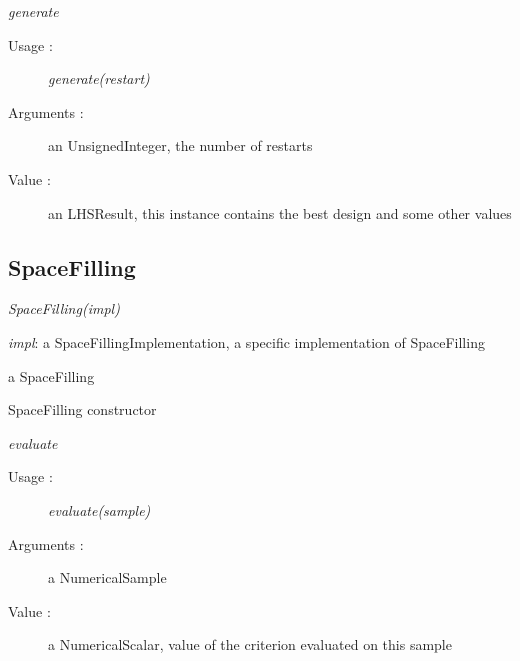 \begin{description}
\item \textit{generate}
  \begin{description}
  \item[Usage :] \textit{generate(restart)}
  \item[Arguments :] an UnsignedInteger, the number of restarts
  \item[Value :] an LHSResult, this instance contains the best design and some other values
  \end{description}

\end{description}

\subsection{SpaceFilling}
\begin{description}

\item[Usage:] \rule{0pt}{1em}
  \begin{description}
  \item \textit{SpaceFilling(impl)}
  \end{description}

\item[Arguments:]  \rule{0pt}{1em}
  \begin{description}
  \item \textit{impl}: a SpaceFillingImplementation, a specific implementation of SpaceFilling
  \end{description}

\item[Value :] a SpaceFilling

\item[Details :]  \rule{0pt}{1em}
  \begin{description}
  \item SpaceFilling constructor
  \end{description}

\item \textit{evaluate}
  \begin{description}
  \item[Usage :] \textit{evaluate(sample)}
  \item[Arguments :] a NumericalSample
  \item[Value :] a NumericalScalar, value of the criterion evaluated on this sample
  \end{description}

\end{description}

